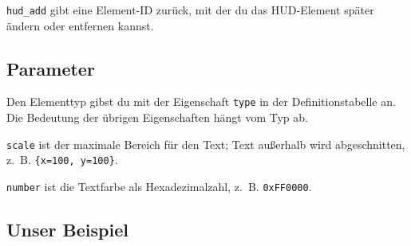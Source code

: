 \begin{Shaded}
\begin{Highlighting}[]
  \OperatorTok{=} \OperatorTok{(}\OperatorTok{)}
  \OperatorTok{=} \OperatorTok{:}\OperatorTok{(\{}
     \OperatorTok{=} \OperatorTok{,}
     \OperatorTok{=} \OperatorTok{\{}  \OperatorTok{=} \OperatorTok{,}  \OperatorTok{=}  \OperatorTok{\},}
     \OperatorTok{=} \OperatorTok{\{}  \OperatorTok{=} \OperatorTok{,}  \OperatorTok{=}  \OperatorTok{\},}
     \OperatorTok{=} \OperatorTok{,}
     \OperatorTok{=} \OperatorTok{\{}  \OperatorTok{=} \OperatorTok{,}  \OperatorTok{=}  \OperatorTok{\},} 
     \OperatorTok{=} \OperatorTok{\{}  \OperatorTok{=} \OperatorTok{,}  \OperatorTok{=}  \OperatorTok{\},} 
\OperatorTok{\})}
\end{Highlighting}
\end{Shaded}

\texttt{hud\_\allowbreak{}add} gibt eine Element-ID zurück, mit der du
das HUD-Element später ändern oder entfernen kannst.

\subsection{Parameter}\label{parameter}

Den Elementtyp gibst du mit der Eigenschaft \texttt{type} in der
Definitionstabelle an. Die Bedeutung der übrigen Eigenschaften hängt vom
Typ ab.

\texttt{scale} ist der maximale Bereich für den Text; Text außerhalb
wird abgeschnitten, z.~B. \texttt{\{x=100, y=100\}}.

\texttt{number} ist die Textfarbe als Hexadezimalzahl, z.~B.
\texttt{0xFF0000}.

\subsection{Unser Beispiel}\label{unser-beispiel}

